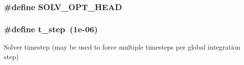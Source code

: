 \subsubsection[{\texorpdfstring{S\+O\+L\+V\+\_\+\+O\+P\+T\+\_\+\+H\+E\+AD}{SOLV_OPT_HEAD}}]{\setlength{\rightskip}{0pt plus 5cm}\#define S\+O\+L\+V\+\_\+\+O\+P\+T\+\_\+\+H\+E\+AD}\hypertarget{solver__options_8cuh_a0cdb20d794f10fb22eebe8854ae6aa45}{}\label{solver__options_8cuh_a0cdb20d794f10fb22eebe8854ae6aa45}
\subsubsection[{\texorpdfstring{t\+\_\+step}{t_step}}]{\setlength{\rightskip}{0pt plus 5cm}\#define t\+\_\+step~(1e-\/06)}\hypertarget{solver__options_8cuh_aaeb7127cf3bf0b49cec6554fbc101866}{}\label{solver__options_8cuh_aaeb7127cf3bf0b49cec6554fbc101866}
Solver timestep (may be used to force multiple timesteps per global integration step) 
